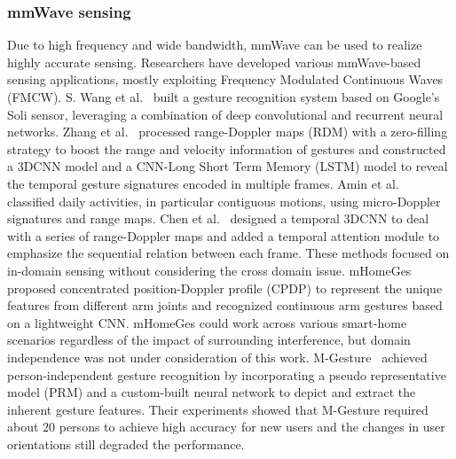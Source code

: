 \documentclass[journal]{IEEEtran}
\begin{document}
\subsubsection{mmWave sensing}
Due to high frequency and wide bandwidth, mmWave can be used to realize highly accurate sensing. Researchers have developed various mmWave-based sensing applications, mostly exploiting Frequency Modulated Continuous Waves (FMCW). 
S. Wang et al.~\cite{Soli:2016} built a gesture recognition system based on Google’s Soli sensor, leveraging a combination of deep convolutional and recurrent neural networks.
Zhang et al.~\cite{ZhangG:2020} processed range-Doppler maps (RDM) with a zero-filling strategy to boost the range and velocity information of gestures and constructed a 3DCNN model and a CNN-Long Short Term Memory (LSTM) model to reveal the temporal gesture signatures encoded in multiple frames. 
Amin et al.~\cite{Amin2020} classified daily activities, in particular contiguous motions, using micro-Doppler signatures and range maps. 
Chen et al.~\cite{ChenH:2022} designed a temporal 3DCNN to deal with a series of range-Doppler maps and added a temporal attention module to emphasize the sequential relation between each frame. 
These methods focused on in-domain sensing without considering the cross domain issue.
mHomeGes~\cite{LiuH:2020} proposed concentrated position-Doppler profile (CPDP) to represent the unique features from different arm joints and recognized continuous arm gestures based on a lightweight CNN. mHomeGes could work across various smart-home scenarios regardless of the impact of surrounding interference, but domain independence was not under consideration of this work.  
M-Gesture~\cite{LiuH:2022} achieved person-independent gesture recognition by incorporating a pseudo representative model (PRM) and a custom-built neural network to depict and extract the inherent gesture features. Their experiments showed that M-Gesture required about 20 persons to achieve high accuracy for new users and the changes in user orientations still degraded the performance. 
 
\end{document}

